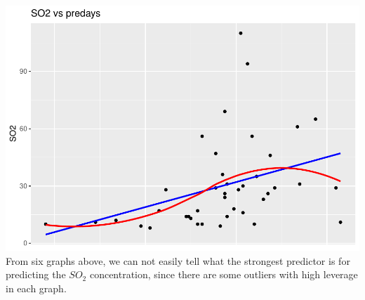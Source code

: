 \documentclass[
]{article}
\begin{document}
\includegraphics[width=0.5\linewidth,height=0.33\textheight]{HUDM6122-Homework_03-Chenguang-Pan_files/figure-latex/unnamed-chunk-3-6}
From six graphs above, we can not easily tell what the strongest
predictor is for predicting the \(SO_2\) concentration, since there are
some outliers with high leverage in each graph.
\end{document}

